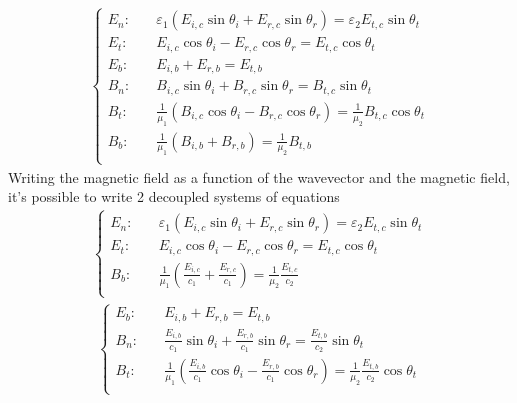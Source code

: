 \documentclass[letterpaper,10pt,english]{jupyterBook}
\begin{document}
\begin{equation*}
\begin{split}
\begin{cases}
 E_n: & \quad \varepsilon_1   \left( E_{i,c} \sin \theta_i + E_{r,c} \sin \theta_r \right) = \varepsilon_2   E_{t,c} \sin \theta_{t} \\
 E_t: & \quad                        E_{i,c} \cos \theta_i - E_{r,c} \cos \theta_r         =                 E_{t,c} \cos \theta_{t} \\
 E_b: & \quad                        E_{i,b}               + E_{r,b}                       =                 E_{t,b}                 \\
 B_n: & \quad                        B_{i,c} \sin \theta_i + B_{r,c} \sin \theta_r         =                 B_{t,c} \sin \theta_{t} \\
 B_t: & \quad \frac{1}{\mu_1} \left( B_{i,c} \cos \theta_i - B_{r,c} \cos \theta_r \right) = \frac{1}{\mu_2} B_{t,c} \cos \theta_{t} \\
 B_b: & \quad \frac{1}{\mu_1} \left( B_{i,b}               + B_{r,b}               \right) = \frac{1}{\mu_2} B_{t,b}                 \\
\end{cases}\end{split}
\end{equation*}
\sphinxAtStartPar
Writing the magnetic field as a function of the wave\sphinxhyphen{}vector and the magnetic field, it’s possible to write 2 decoupled systems of equations
\begin{equation*}
\begin{split}\begin{cases}
 E_n: & \quad \varepsilon_1   \left( E_{i,c} \sin \theta_i + E_{r,c} \sin \theta_r \right) = \varepsilon_2   E_{t,c} \sin \theta_{t} \\
 E_t: & \quad                        E_{i,c} \cos \theta_i - E_{r,c} \cos \theta_r         =                 E_{t,c} \cos \theta_{t} \\
 B_b: & \quad \frac{1}{\mu_1} \left( \frac{E_{i,c}}{c_1}   + \frac{E_{r,c}}{c_1}   \right) = \frac{1}{\mu_2} \frac{E_{t,c}}{c_2}     \\
\end{cases}\end{split}
\end{equation*}\begin{equation*}
\begin{split}\begin{cases}
 E_b: & \quad                        E_{i,b}               + E_{r,b}                       =                 E_{t,b}                 \\
 B_n: & \quad                        \frac{E_{i,b}}{c_1} \sin \theta_i + \frac{E_{r,b}}{c_1} \sin \theta_r         =                 \frac{E_{t,b}}{c_2} \sin \theta_{t} \\
 B_t: & \quad \frac{1}{\mu_1} \left( \frac{E_{i,b}}{c_1} \cos \theta_i - \frac{E_{r,b}}{c_1} \cos \theta_r \right) = \frac{1}{\mu_2} \frac{E_{t,b}}{c_2} \cos \theta_{t} \\
\end{cases}\end{split}
\end{equation*}
\end{document}
